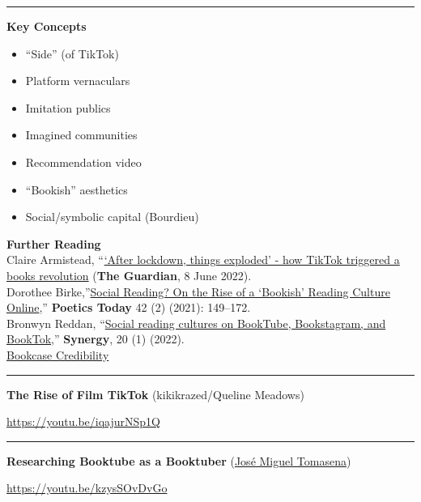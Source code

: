 \documentclass[
  letterpaper,
  DIV=11,
  numbers=noendperiod,
  oneside]{scrartcl}
\providecommand{\tightlist}{%
  \setlength{\itemsep}{0pt}\setlength{\parskip}{0pt}}
\begin{document}
\begin{center}\rule{0.5\linewidth}{0.5pt}\end{center}

\textbf{Key Concepts}

\begin{itemize}
\tightlist
\item
  ``Side'' (of TikTok)
\item
  Platform vernaculars
\item
  Imitation publics
\item
  Imagined communities
\item
  Recommendation video
\item
  ``Bookish'' aesthetics
\item
  Social/symbolic capital (Bourdieu)
\end{itemize}

\textbf{Further Reading}\\
Claire Armistead,
``\href{https://www.theguardian.com/books/2022/jun/08/lockdown-exploded-tiktok-books-revolution-booktok}{`After
lockdown, things exploded' - how TikTok triggered a books revolution}
(\textbf{The Guardian}, 8 June 2022).\\
Dorothee Birke,''\href{https://doi.org/10.1215/03335372-8883178}{Social
Reading? On the Rise of a `Bookish' Reading Culture Online},''
\textbf{Poetics Today} 42 (2) (2021): 149--172.\\
Bronwyn Reddan,
``\href{http://www.slav.vic.edu.au/index.php/Synergy/article/view/597}{Social
reading cultures on BookTube, Bookstagram, and BookTok},''
\textbf{Synergy}, 20 (1) (2022).\\
\href{https://x.com/bcredibility?lang=en}{Bookcase Credibility}\\

\begin{center}\rule{0.5\linewidth}{0.5pt}\end{center}

\textbf{The Rise of Film TikTok} (kikikrazed/Queline Meadows)

\url{https://youtu.be/iqajurNSp1Q}

\begin{center}\rule{0.5\linewidth}{0.5pt}\end{center}

\textbf{Researching Booktube as a Booktuber}
(\href{https://www.youtube.com/@jmtomasena_}{José Miguel Tomasena})

\url{https://youtu.be/kzysSOvDvGo}
\end{document}
